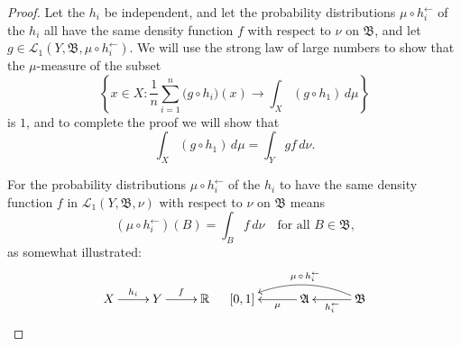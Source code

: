 \documentclass[
twoside=true,
paper=letter,
fontsize=9pt,
pagesize=auto,
leqno,
openany,
headsepline,
overfullrule,
]{scrbook}
\theoremstyle{plain}
\theoremstyle{plain}
\theoremstyle{definition}
\theoremstyle{bfnoteitalic}
\theoremstyle{bfnoteroman}
\newcommand{\sigalg}[1]{\mathfrak{#1}}
\newcommand{\cali}[1]{\mathscr{#1}}
\newcommand{\preimage}[1]{#1^{\leftarrow}}
\newcommand{\R}{\mathbb{R}}
\newcommand{\sigmaalgebra}{\sigalg{A}}
\newcommand{\sigmaalgebraii}{\sigalg{B}}
\newcommand{\funcf}{f}
\newcommand{\funcg}{g}
\newcommand{\funch}{h}
\newcommand{\function}{f}
\newcommand{\measurespace}{X}
\newcommand{\measurespaceii}{Y}
\newcommand{\mspaceelt}{x}
\newcommand{\measure}{\mu}
\newcommand{\measmu}{\mu}
\newcommand{\measnu}{\nu}
\newcommand{\setii}{B}
\begin{document}
\begin{proof}
Let the $\funch_i$ be independent, and let the probability distributions 
$\measure\circ\preimage{\funch_i}$
of the $\funch_i$ all have the same density function $\function$ with respect to 
$\measnu$ on $\sigmaalgebraii$, and let 
$\funcg\in
\cali{L}_1(\measurespaceii,\sigmaalgebraii,\measmu\circ\preimage{\funch_i})$.
We will use the strong law of large numbers to show that the $\measure$-measure of the subset
\[
\left\{ 
\mspaceelt\in\measurespace : 
\frac{1}{n} \sum_{i=1}^n \bigl( \funcg \circ \funch_i \bigr) (x) \to
\int_\measurespace (\funcg \circ \funch_1) \,d\measure 
\right\}
\]
is $1$, and to complete the proof we will show that
\[
\int_\measurespace (\funcg \circ \funch_1) \,d\measure
=
\int_\measurespaceii \funcg \funcf \,d\measnu.
\]


For the probability distributions 
$\measure\circ\preimage{\funch_i}$
of the $\funch_i$ to have the same density function 
$\funcf$ in $\cali{L}_1(\measurespaceii,\sigmaalgebraii,\measnu)$ 
with respect to  $\measnu$ on $\sigmaalgebraii$ means
\[
(\measmu\circ\preimage{\funch_i})(\setii)
=
\int_\setii \funcf\, d\measnu
\quad\text{for all $\setii\in\sigmaalgebraii$,}
\]
as somewhat illustrated:
\[
\xymatrix@R=18pt{
\measurespace \ar[r]^{\funch_i} 
& \measurespaceii \ar[r]^{\funcf} 
& \R \\
}
\quad
\xymatrix@R=18pt@C=30pt{
[0,1]
& \sigmaalgebra 
\ar[l]^-\measmu
& \sigmaalgebraii
\ar[l]^{\preimage{\funch_i}} 
\ar@/_12pt/[ll]_-{\measmu\,\circ\,\preimage{\funch_i}}
}
\]


\end{proof}
\end{document}
